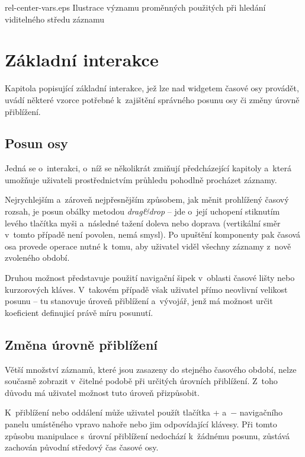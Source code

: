 			{}{rel-center-vars.eps}
			{Ilustrace významu proměnných použitých při hledání viditelného středu záznamu}
			{}
			
			
		\section{Základní interakce}
		Kapitola popisující základní interakce, jež lze nad widgetem časové osy provádět, uvádí některé vzorce potřebné k~zajištění správného posunu osy či změny úrovně přiblížení.
		
		\label{zakladni-interakce}
			\subsection{Posun osy}
			\label{posun-osy}
				Jedná se o~interakci, o~níž se několikrát zmiňují předcházející kapitoly a~která umožňuje uživateli prostřednictvím průhledu pohodlně procházet záznamy.
				
				Nejrychlejším a~zároveň nejpřesnějším způsobem, jak měnit prohlížený časový rozsah, je posun obálky metodou \emph{drag\&drop} -- jde o~její uchopení stiknutím levého tlačítka myši a~následné tažení doleva nebo doprava (vertikální směr v~tomto případě není povolen, nemá smysl). Po upuštění komponenty pak časová osa provede operace nutné k~tomu, aby uživatel viděl všechny záznamy z~nově zvoleného období.
				
				Druhou možnost představuje použití navigační šipek v~oblasti časové lišty nebo kurzorových kláves. V~takovém případě však uživatel přímo neovlivní velikost posunu -- tu stanovuje úroveň přiblížení a~vývojář, jenž má možnost určit koeficient definujicí právě míru posunutí.
			
			\subsection{Změna úrovně přiblížení}
			\label{zmena-urovne-priblizeni}
				Větší množství záznamů, které jsou zasazeny do stejného časového období, nelze současně zobrazit v~čitelné podobě při určitých úrovních přiblížení. Z~toho důvodu má uživatel možnost tuto úroveň přizpůsobit.
				
			 K~přiblížení nebo oddálení může uživatel použít tlačítka {\sf +} a~$\mathsf{-}$ navigačního panelu umístěného vpravo nahoře nebo jim odpovídající klávesy. Při tomto způsobu manipulace s~úrovní přiblížení nedochází k~žádnému posunu, zůstává zachován původní středový čas časové osy.
				
